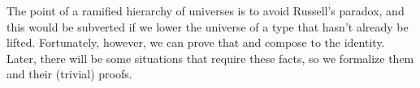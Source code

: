 The point of a ramified hierarchy of universes is to avoid Russell's paradox, and this would be subverted if we lower the universe of a type that hasn't already be lifted.  Fortunately, however, we can prove that  and  compose to the identity. Later, there will be some situations that require these facts, so we formalize them and their (trivial) proofs.
\ccpad
\begin{code}%
\>[0]\AgdaSpace{}%
\AgdaSymbol{:}\AgdaSpace{}%
\AgdaSymbol{\{}\AgdaSpace{}%
\AgdaSpace{}%
\AgdaSymbol{:}\AgdaSpace{}%
\AgdaSymbol{\}\{}\AgdaSpace{}%
\AgdaSymbol{:}\AgdaSpace{}%
\AgdaSpace{}%
\AgdaSymbol{\}}\AgdaSpace{}%
\AgdaSpace{}%
\AgdaSymbol{\{}\AgdaSymbol{\}\{}\AgdaSymbol{\}}\AgdaSpace{}%
\AgdaSpace{}%
\AgdaSpace{}%
\AgdaSpace{}%
\AgdaSpace{}%
\<%
\\
\>[0]\AgdaSpace{}%
\AgdaSymbol{=}\AgdaSpace{}%
\AgdaSpace{}%
\AgdaSymbol{\AgdaUnderscore{}}\<%
\\
%
\\[\AgdaEmptyExtraSkip]%
\>[0]\AgdaSpace{}%
\AgdaSymbol{:}\AgdaSpace{}%
\AgdaSymbol{\{}\AgdaSpace{}%
\AgdaSpace{}%
\AgdaSymbol{:}\AgdaSpace{}%
\AgdaSymbol{\}\{}\AgdaSpace{}%
\AgdaSymbol{:}\AgdaSpace{}%
\AgdaSpace{}%
\AgdaSymbol{\}}\AgdaSpace{}%
\AgdaSpace{}%
\AgdaSpace{}%
\AgdaSpace{}%
\AgdaSpace{}%
\AgdaSpace{}%
\AgdaSpace{}%
\AgdaSymbol{(}\AgdaSymbol{\{}\AgdaSymbol{\}\{}\AgdaSymbol{\}}\AgdaSpace{}%
\AgdaSymbol{)}\<%
\\
\>[0]\AgdaSpace{}%
\AgdaSymbol{=}\AgdaSpace{}%
\AgdaSpace{}%
\AgdaSymbol{\AgdaUnderscore{}}\<%
\end{code}


